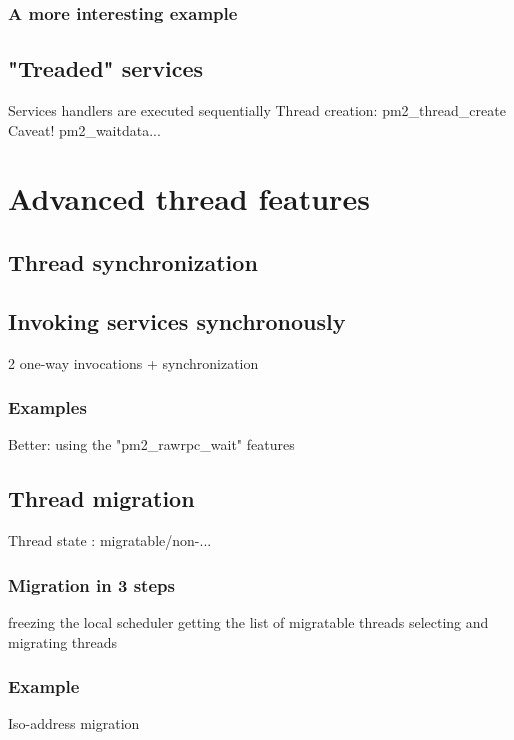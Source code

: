 \documentclass[a4paper,11pt]{article}
\begin{document}
\subsubsection{A more interesting example}

\subsection{"Treaded" services}
        Services handlers are executed sequentially
        Thread creation: pm2\_thread\_create
        Caveat! pm2\_waitdata...


\section{Advanced thread features}

\subsection{Thread synchronization}

\subsection{Invoking services synchronously}
        2 one-way invocations + synchronization

\subsubsection{Examples}
        Better: using the "pm2\_rawrpc\_wait" features

\subsection{Thread migration}
        Thread state : migratable/non-...

\subsubsection{Migration in 3 steps}
        freezing the local scheduler
        getting the list of migratable threads
        selecting and migrating threads

\subsubsection{Example}
        Iso-address migration
\end{document}

